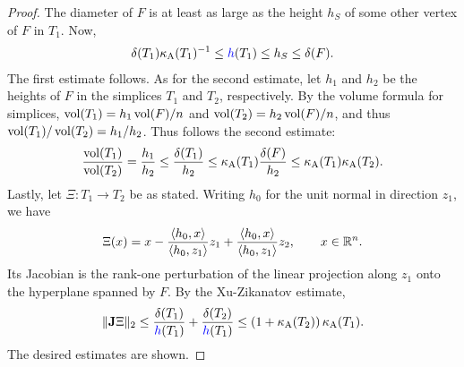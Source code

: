\documentclass[10pt,a4paper]{article}
\newcommand{\mwl}[1]{{\color{red}#1}}
\begin{document}
\begin{proof}
    The diameter of $F$ is at least as large as the height $h_S$ of some other vertex of $F$ in $T_{1}$. 
    Now, 
    \begin{align*}
        \diam(T_{1}) \aspectratio(T_{1})^{-1} \leq \height(T_{1}) \leq h_S \leq \diam(F).
    \end{align*}
    The first estimate follows. 
    As for the second estimate,
    let $h_1$ and $h_2$ be the heights of $F$ in the simplices $T_1$ and $T_2$, respectively. 
    By the volume formula for simplices, $\operatorname{vol}(T_1) = h_1 \operatorname{vol}(F)/n$ and $\operatorname{vol}(T_2) = h_2 \operatorname{vol}(F)/n$, and thus $\operatorname{vol}(T_1)/\operatorname{vol}(T_2) = h_1/h_2$. Thus follows the second estimate: 
    \begin{align*}
        \frac{ \operatorname{vol}(T_1) }{ \operatorname{vol}(T_2) }
        = 
        \frac{ h_1 }{ h_2 }
        \leq
        \frac{ {\delta}(T_1) }{ h_2 }
        \leq
        \kappa_{\rm A}(T_{1}) \frac{ {\delta}(F) }{ h_2 }
        \leq
        \kappa_{\rm A}(T_{1}) \kappa_{\rm A}(T_{2})
        .
    \end{align*}
    Lastly, let $\Xi : T_1 \rightarrow T_2$ be as stated. 
    Writing $h_0$ for the unit normal in direction $z_1$, we have 
    \begin{align*}
        \Xi(x) 
        = 
        x 
        - \frac{ \langle h_0, x \rangle }{ \langle h_0, z_1 \rangle } z_1
        + \frac{ \langle h_0, x \rangle }{ \langle h_0, z_1 \rangle } z_2
        ,
        \qquad 
        x \in {\mathbb R}^{n}
        .
    \end{align*}
    Its Jacobian is the rank-one perturbation of the linear projection along $z_1$ onto the hyperplane spanned by $F$. 
    By the Xu-Zikanatov estimate,
    \begin{align*}
        \matnorm{ \Jacobian \Xi }
        \leq 
        \frac{ \diam(T_1) }{ \height(T_1) }
        +
        \frac{ \diam(T_2) }{ \height(T_1) }
        \leq 
        \left( 1 + \aspectratio(T_2) \right)
        \aspectratio(T_1)
        .
    \end{align*}
    The desired estimates are shown.
\begin{comment}
    \mwl{Tighter estimate via geometry}
    Matrix inverse lemma:
    \begin{align*}
        A ( A + (z_2-z_1) e_1^t )^{-1}
        =
        \Id
        - 
        \left( 1 + e_1^{t} A^{-1} (z_2-z_1) \right)^{-1}
        (z_2-z_1) e_1^t \cdot A^{-1}
        =
        \Id
        - 
        \left( e_1^{t} A^{-1} z_2 \right)^{-1}
        (z_2-z_1) e_1^t \cdot A^{-1}
        .
    \end{align*}
    Putting in a multiple of $\alpha z_1$, we find 
    \begin{align*}
        \alpha z_1
        -
        \left( e_1^{t} A^{-1} z_2 \right)^{-1}
        (z_2-z_1) 
        .
    \end{align*}


\end{comment}
\end{proof}
\end{document}
